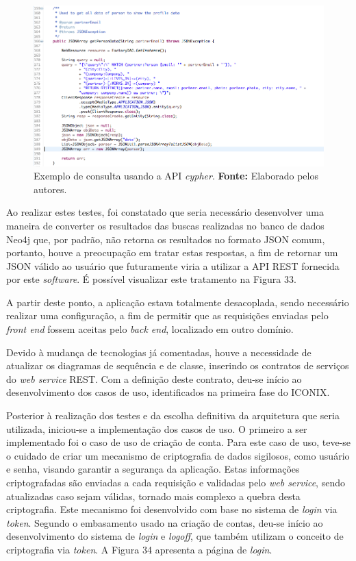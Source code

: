 \newpage 
\begin{figure}[h!]
	\centerline{\includegraphics[scale=0.45]{./imagens/query-cypher.png}}
	\caption[Exemplo de consulta usando a API \textit{cypher}]
	{Exemplo de consulta usando a API \textit{cypher}. \textbf{Fonte:} Elaborado pelos autores.}
	\label{fig:exemplo1}
\end{figure}

\par Ao realizar estes testes, foi constatado que seria necessário desenvolver uma maneira de converter os resultados das buscas realizadas no banco de dados Neo4j que, por padrão, não retorna os resultados no formato JSON comum, portanto, houve a preocupação em tratar estas respostas, a fim de retornar um JSON válido ao usuário que futuramente viria a utilizar a API REST fornecida por este \textit{software}. É possível visualizar este tratamento na Figura 33. 
 
\par A partir deste ponto, a aplicação estava totalmente desacoplada, sendo necessário realizar uma configuração, a fim de permitir que as requisições enviadas pelo \textit{front end} fossem aceitas pelo \textit{back end}, localizado em outro domínio.

\par Devido à mudança de tecnologias já comentadas, houve a necessidade de atualizar os diagramas de sequência e de classe, inserindo os contratos de serviços do \textit{web service} REST. Com a definição deste contrato, deu-se início ao desenvolvimento dos casos de uso, identificados na primeira fase do ICONIX. 

\par Posterior à realização dos testes e da escolha definitiva da arquitetura que seria utilizada, iniciou-se a implementação dos casos de uso. O primeiro a ser implementado foi o caso de uso de criação de conta. Para este caso de uso, teve-se o cuidado de criar um mecanismo de criptografia de dados sigilosos, como usuário e senha, visando garantir a segurança da aplicação. Estas informações criptografadas são enviadas a cada requisição e validadas pelo \textit{web service}, sendo atualizadas caso sejam válidas, tornado mais complexo a quebra desta criptografia. Este mecanismo foi desenvolvido com base no sistema de \textit{login} via \textit{token}. Segundo o embasamento usado na criação de contas, deu-se início ao desenvolvimento do sistema de \textit{login} e \textit{logoff}, que também utilizam o conceito de criptografia via \textit{token}. A Figura 34 apresenta a página de \textit{login}.

